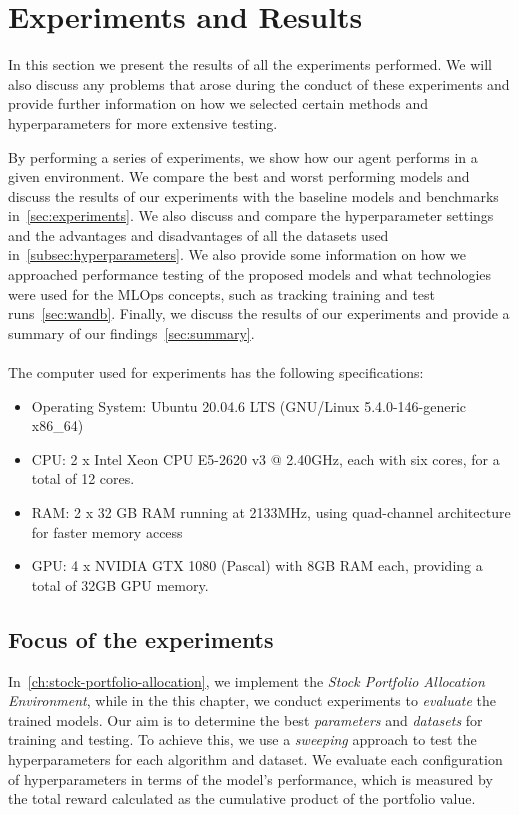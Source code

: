 \documentclass[../xlapes02]{subfiles}
\begin{document}
    \chapter{Experiments and Results}\label{ch:experiments-and-results}
    In this section we present the results of all the experiments performed. We will also discuss any problems that arose during the conduct of these experiments and provide further information on how we selected certain methods and hyperparameters for more extensive testing.

    By performing a series of experiments, we show how our agent performs in a given environment. We compare the best and worst performing models and discuss the results of our experiments with the baseline models and benchmarks in~\cref{sec:experiments}. We also discuss and compare the hyperparameter settings and the advantages and disadvantages of all the datasets used in~\cref{subsec:hyperparameters}. We also provide some information on how we approached performance testing of the proposed models and what technologies were used for the MLOps concepts, such as tracking training and test runs~\cref{sec:wandb}. Finally, we discuss the results of our experiments and provide a summary of our findings~\cref{sec:summary}.
    \\
    \\
    The computer used for experiments has the following specifications:
    \begin{itemize}
        \item Operating System: Ubuntu 20.04.6 LTS (GNU/Linux 5.4.0-146-generic x86\_64)
        \item CPU: 2 x Intel Xeon CPU E5-2620 v3 @ 2.40GHz, each with six cores, for a total of 12 cores.
        \item RAM: 2 x 32 GB RAM running at 2133MHz, using quad-channel architecture for faster memory access
        \item GPU: 4 x NVIDIA GTX 1080 (Pascal) with 8GB RAM each, providing a total of 32GB GPU memory.
    \end{itemize}


    \section{Focus of the experiments}\label{sec:focus-of-the-experiments}
    In~\cref{ch:stock-portfolio-allocation}, we implement the \emph{Stock Portfolio Allocation Environment}, while in the this chapter, we conduct experiments to \emph{evaluate} the trained models. Our aim is to determine the best \emph{parameters} and \emph{datasets} for training and testing. To achieve this, we use a \emph{sweeping} approach to test the hyperparameters for each algorithm and dataset. We evaluate each configuration of hyperparameters in terms of the model's performance, which is measured by the total reward calculated as the cumulative product of the portfolio value.
\end{document}
